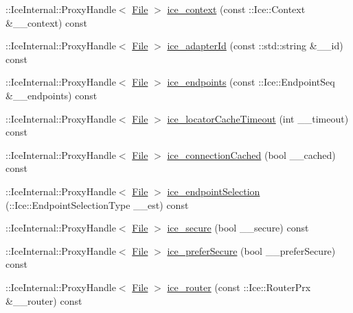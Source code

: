 \begin{DoxyCompactItemize}
\item 
\+::Ice\+Internal\+::\+Proxy\+Handle$<$ \hyperlink{class_ice_proxy_1_1_file_system_1_1_file}{File} $>$ \hyperlink{class_ice_proxy_1_1_file_system_1_1_file_a670519bd28a93c15e09f87c3754585bb}{ice\+\_\+context} (const \+::Ice\+::\+Context \&\+\_\+\+\_\+context) const 
\item 
\+::Ice\+Internal\+::\+Proxy\+Handle$<$ \hyperlink{class_ice_proxy_1_1_file_system_1_1_file}{File} $>$ \hyperlink{class_ice_proxy_1_1_file_system_1_1_file_ab50e54a94f8c766f16b5701572abe7b1}{ice\+\_\+adapter\+Id} (const \+::std\+::string \&\+\_\+\+\_\+id) const 
\item 
\+::Ice\+Internal\+::\+Proxy\+Handle$<$ \hyperlink{class_ice_proxy_1_1_file_system_1_1_file}{File} $>$ \hyperlink{class_ice_proxy_1_1_file_system_1_1_file_a7904269ab87786c05071da2bd905af5c}{ice\+\_\+endpoints} (const \+::Ice\+::\+Endpoint\+Seq \&\+\_\+\+\_\+endpoints) const 
\item 
\+::Ice\+Internal\+::\+Proxy\+Handle$<$ \hyperlink{class_ice_proxy_1_1_file_system_1_1_file}{File} $>$ \hyperlink{class_ice_proxy_1_1_file_system_1_1_file_a9364268ab8b5bc31890d294a2494d24f}{ice\+\_\+locator\+Cache\+Timeout} (int \+\_\+\+\_\+timeout) const 
\item 
\+::Ice\+Internal\+::\+Proxy\+Handle$<$ \hyperlink{class_ice_proxy_1_1_file_system_1_1_file}{File} $>$ \hyperlink{class_ice_proxy_1_1_file_system_1_1_file_aee0558b1220d03027d040e7e90813f27}{ice\+\_\+connection\+Cached} (bool \+\_\+\+\_\+cached) const 
\item 
\+::Ice\+Internal\+::\+Proxy\+Handle$<$ \hyperlink{class_ice_proxy_1_1_file_system_1_1_file}{File} $>$ \hyperlink{class_ice_proxy_1_1_file_system_1_1_file_aedf8538300f9a42d62a78d9ff42c23fa}{ice\+\_\+endpoint\+Selection} (\+::Ice\+::\+Endpoint\+Selection\+Type \+\_\+\+\_\+est) const 
\item 
\+::Ice\+Internal\+::\+Proxy\+Handle$<$ \hyperlink{class_ice_proxy_1_1_file_system_1_1_file}{File} $>$ \hyperlink{class_ice_proxy_1_1_file_system_1_1_file_a8406a021ebdd04c9f4b25ada822b0bc6}{ice\+\_\+secure} (bool \+\_\+\+\_\+secure) const 
\item 
\+::Ice\+Internal\+::\+Proxy\+Handle$<$ \hyperlink{class_ice_proxy_1_1_file_system_1_1_file}{File} $>$ \hyperlink{class_ice_proxy_1_1_file_system_1_1_file_a7b7536cf0da9cfadea53a4a50ae73110}{ice\+\_\+prefer\+Secure} (bool \+\_\+\+\_\+prefer\+Secure) const 
\item 
\+::Ice\+Internal\+::\+Proxy\+Handle$<$ \hyperlink{class_ice_proxy_1_1_file_system_1_1_file}{File} $>$ \hyperlink{class_ice_proxy_1_1_file_system_1_1_file_a3ac97662c4c182baa0e76269dffdac92}{ice\+\_\+router} (const \+::Ice\+::\+Router\+Prx \&\+\_\+\+\_\+router) const 

\end{DoxyCompactItemize}
